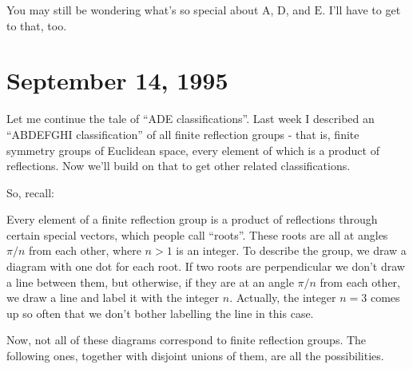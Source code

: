 \documentclass{article}
\begin{document}
You may still be wondering what's so special about \(\mathrm{A}\),
\(\mathrm{D}\), and \(\mathrm{E}\). I'll have to get to that, too.



\hypertarget{week63}{%
\section{September 14, 1995}\label{week63}}

Let me continue the tale of ``ADE classifications''. Last week I
described an ``ABDEFGHI classification'' of all finite reflection groups
- that is, finite symmetry groups of Euclidean space, every element of
which is a product of reflections. Now we'll build on that to get other
related classifications.

So, recall:

Every element of a finite reflection group is a product of reflections
through certain special vectors, which people call ``roots''. These
roots are all at angles \(\pi/n\) from each other, where \(n > 1\) is an
integer. To describe the group, we draw a diagram with one dot for each
root. If two roots are perpendicular we don't draw a line between them,
but otherwise, if they are at an angle \(\pi/n\) from each other, we
draw a line and label it with the integer \(n\). Actually, the integer
\(n = 3\) comes up so often that we don't bother labelling the line in
this case.

Now, not all of these diagrams correspond to finite reflection groups.
The following ones, together with disjoint unions of them, are all the
possibilities.
\end{document}

